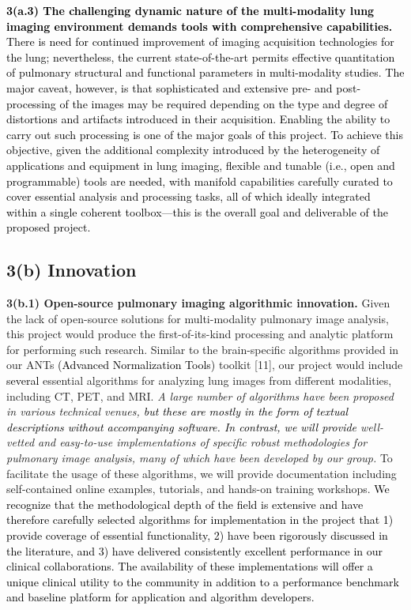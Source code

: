 \documentclass[11pt,]{article}
\begin{document}
\textbf{\textcolor{black}{3(a.3) The challenging dynamic nature of the multi-modality lung imaging
environment demands tools with comprehensive capabilities.}}
\textcolor{black}{There is need
for continued improvement of imaging acquisition technologies for the
lung; nevertheless, the current state-of-the-art permits effective
quantitation of pulmonary structural and functional parameters in
multi-modality studies. The major caveat, however, is that sophisticated
and extensive pre- and post-processing of the images may be required
depending on the type and degree of distortions and artifacts introduced
in their acquisition. Enabling the ability to carry out such processing
is one of the major goals of this project. To achieve this objective,
given the additional complexity introduced by the heterogeneity of
applications and equipment in lung imaging, flexible and tunable (i.e.,
open and programmable) tools are needed, with manifold capabilities
carefully curated to cover essential analysis and processing tasks,
all of which ideally integrated within a single coherent toolbox---this is
the overall goal and deliverable of the proposed project.}

\subsection{\texorpdfstring{\textbf{3(b)
Innovation}}{3(b) Innovation}}\label{b-innovation}

\textbf{3(b.1) Open-source pulmonary imaging algorithmic innovation.}
Given the lack of open-source solutions for multi-modality pulmonary
image analysis, this project would produce the first-of-its-kind
processing and analytic platform for performing such research. Similar
to the brain-specific algorithms provided in our ANTs
\textcolor{black}{(Advanced Normalization Tools)} toolkit {[}11{]}, our
project would include \textcolor{black}{several} essential algorithms
for analyzing lung images from different modalities, including CT, PET,
and MRI. \emph{A large number of algorithms have been proposed in
various technical venues,
\textcolor{black}{but these are mostly in the form of
textual descriptions without accompanying software.}
\textcolor{black}{In contrast, we will provide} well-vetted and
easy-to-use implementations of specific robust methodologies for
pulmonary image analysis, many of which have been developed by our
group.} To facilitate the usage of these algorithms, we will provide
documentation including self-contained online examples, tutorials, and
hands-on training workshops.
\textcolor{black}{We recognize that the methodological depth of the field is extensive
and have therefore carefully selected algorithms for implementation in the project that
1) provide coverage of essential functionality, 2) have been rigorously
discussed in the literature, and 3) have delivered consistently excellent
performance in our clinical collaborations.  The availability of these
implementations will offer a unique clinical utility to the community in
addition to a performance benchmark and baseline platform for
application and algorithm developers.}
\end{document}
